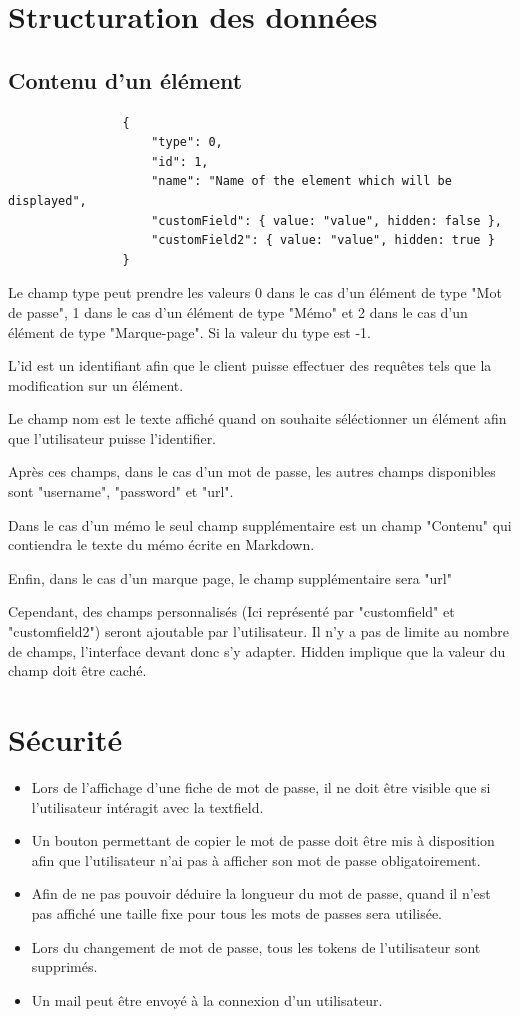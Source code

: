 \documentclass[oneside]{report}
\begin{document}
	\section{Structuration des données}{
		\subsection{Contenu d'un élément} {
			\vspace{1cm}
			\begin{lstlisting}
				{
					"type": 0,
					"id": 1,
					"name": "Name of the element which will be displayed",
					"customField": { value: "value", hidden: false },
					"customField2": { value: "value", hidden: true }
				}
			\end{lstlisting}
			\vspace{1cm}
			\par Le champ type peut prendre les valeurs 0 dans le cas d'un élément de type "Mot de passe", 1 dans le cas d'un élément de type "Mémo" et 2 dans le cas d'un élément de type "Marque-page". Si la valeur du type est -1.
			\par L'id est un identifiant afin que le client puisse effectuer des requêtes tels que la modification sur un élément.
			\par Le champ nom est le texte affiché quand on souhaite séléctionner un élément afin que l'utilisateur puisse l'identifier.
			\par Après ces champs, dans le cas d'un mot de passe, les autres champs disponibles sont "username", "password" et "url".
			\par Dans le cas d'un mémo le seul champ supplémentaire est un champ "Contenu" qui contiendra le texte du mémo écrite en Markdown.
			\par Enfin, dans le cas d'un marque page, le champ supplémentaire sera "url"
			\par Cependant, des champs personnalisés (Ici représenté par "customfield" et "customfield2") seront ajoutable par l'utilisateur. Il n'y a pas de limite au nombre de champs, l'interface devant donc s'y adapter. Hidden implique que la valeur du champ doit être caché.
		}
	}
	\section{Sécurité}{
		\begin{itemize}
			\item Lors de l'affichage d'une fiche de mot de passe, il ne doit être visible que si l'utilisateur intéragit avec la textfield.
			\item Un bouton permettant de copier le mot de passe doit être mis à disposition afin que l'utilisateur n'ai pas à afficher son mot de passe obligatoirement.
			\item Afin de ne pas pouvoir déduire la longueur du mot de passe, quand il n'est pas affiché une taille fixe pour tous les mots de passes sera utilisée.
			\item Lors du changement de mot de passe, tous les tokens de l'utilisateur sont supprimés.
			\item Un mail peut être envoyé à la connexion d'un utilisateur.
		\end{itemize}
	}
\end{document}

